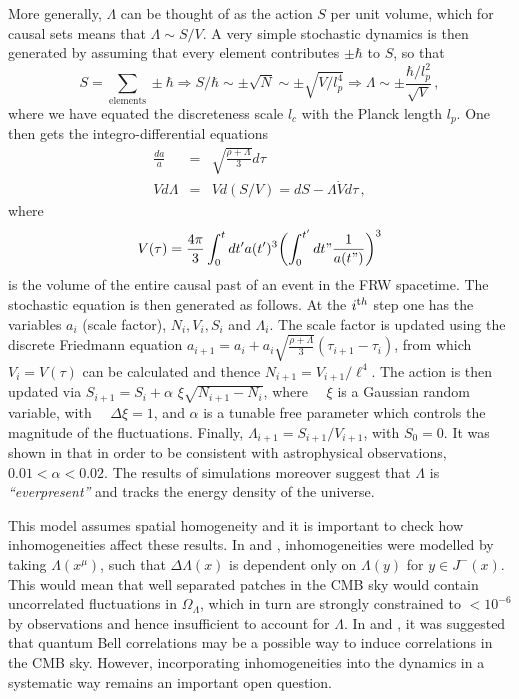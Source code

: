 More generally, $\Lambda$ can be thought of as the action $S$  per unit volume, which for causal sets  means that $\Lambda \sim S/V$.  A  very
   simple  stochastic dynamics is then generated by assuming that every element contributes $\pm \hbar$ to $S$, so that 
   \begin{equation}
     S=\sum_{\mathrm{elements}} \pm \hbar \Rightarrow S/\hbar \sim \pm \sqrt{N} \sim \pm \sqrt{V/l_p^4} \Rightarrow \Lambda\sim
     \pm \frac{\hbar /l_p^2}{\sqrt{V}} \,,  
\end{equation} 
 where we have equated the discreteness scale $l_c$ with the Planck length $l_p$. One then gets the integro-differential equations  
\begin{eqnarray} 
\frac{da}{a} &=&\sqrt{\frac{\rho+\Lambda}{3}}d\tau \nonumber \\ 
V d\Lambda &=& Vd(S/V)=dS-\Lambda \dot{V} d\tau \,, \nonumber 
\end{eqnarray} 
where
\begin{equation}
  V(\tau) = \frac{4\pi}{3} \int_0^t dt' a(t')^3 \biggl( \int_0^{t'} dt" \frac{1}{a(t")}\biggr)^3
  \end{equation} 
is the volume of the entire causal past of an event in the FRW spacetime.  
The stochastic equation is then generated as follows. At the $i^{\mathrm th}$ step 
one has the variables $a_i$ (scale factor), $N_i,V_i,S_i $ and $ \Lambda_i$. The scale factor is updated using the
discrete  Friedmann equation  
$a_{i+1}=a_i+a_i\sqrt{\frac{\rho+\Lambda}{3}}(\tau_{i+1}-\tau_i)$, from which $V_i=V(\tau)$ can be calculated and thence 
$N_{i+1}=V_{i+1}/\ell^4$. The  action is then updated  via $S_{i+1}=S_i+ \alpha \, \, \xi\sqrt{N_{i+1}-N_i}$, where
$\quad\xi$ is a Gaussian random variable, with $\quad\Delta \xi = 1$, and $\alpha$ is a tunable free parameter which
controls the magnitude of the fluctuations.   Finally, $\Lambda_{i+1}=S_{i+1}/V_{i+1}$, with   $S_0=0$.  It was shown in
\cite{lambdathree} that in order to be consistent with astrophysical observations,  $0.01 < \alpha < 0.02$. The results of
simulations moreover suggest  that $\Lambda$ is \emph{``everpresent''} and tracks the energy density of the universe.

This model assumes spatial homogeneity and it is important to check how inhomogeneities affect these results.  In
\cite{barrow} and \cite{zuntz},  inhomogeneities were modelled by taking $\Lambda(x^\mu)$, such that $\Delta \Lambda(x)$ is
dependent only on $\Lambda(y)$ for $y \in J^-(x)$.  This would mean that well separated patches in the CMB sky would
contain uncorrelated fluctuations in $\Omega_\Lambda$, which in turn are strongly constrained to $< 10^{-6}$ by 
observations and hence insufficient to account for $\Lambda$.  In \cite{lambdathree} and \cite{recentlambda}, it was suggested that  quantum Bell
correlations may be a possible way to induce correlations in the CMB sky. However, incorporating inhomogeneities into the
dynamics in a systematic way remains  an
important open question. 

